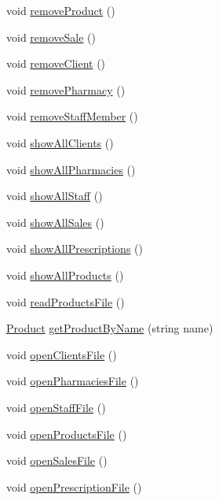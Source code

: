 \begin{DoxyCompactItemize}
void \hyperlink{classDataBase_a6be2328441f5fe20086a4f8b0002adee}{remove\+Product} ()
\item 
void \hyperlink{classDataBase_adba6b4fad6dcb329aae27d8f610edaac}{remove\+Sale} ()
\item 
void \hyperlink{classDataBase_a9fb1b3625b3431d09b4b64a13bbb1e0f}{remove\+Client} ()
\item 
void \hyperlink{classDataBase_af923ee9db26814bf9413afe95262a01d}{remove\+Pharmacy} ()
\item 
void \hyperlink{classDataBase_a26ab8f3d2cb6d78a5105e72c2377c21c}{remove\+Staff\+Member} ()
\item 
void \hyperlink{classDataBase_af4762294e1b25415f7de88f0e8d6d90f}{show\+All\+Clients} ()
\item 
void \hyperlink{classDataBase_ab00290f55389cd62d8ee5594ecf9a6b5}{show\+All\+Pharmacies} ()
\item 
void \hyperlink{classDataBase_aa1d2ae05f581ec45eb8da06e468aec30}{show\+All\+Staff} ()
\item 
void \hyperlink{classDataBase_abf8a64bd81ce3207862b0105d52f646f}{show\+All\+Sales} ()
\item 
void \hyperlink{classDataBase_a40a951f6f2c923ca315655956ab8e196}{show\+All\+Prescriptions} ()
\item 
void \hyperlink{classDataBase_a74dcc435917c328bd89aaf5fd3cb804d}{show\+All\+Products} ()
\item 
void \hyperlink{classDataBase_a32341ca202561239807fb5b3a1f96d13}{read\+Products\+File} ()
\item 
\hyperlink{classProduct}{Product} \hyperlink{classDataBase_ae83d4c612ff8d93b69ab1c05345cd62c}{get\+Product\+By\+Name} (string name)
\item 
void \hyperlink{classDataBase_a514959070d22346ea7ee212e51cab89f}{open\+Clients\+File} ()
\item 
void \hyperlink{classDataBase_a30cd564502803b00dbe575b0bd9376e6}{open\+Pharmacies\+File} ()
\item 
void \hyperlink{classDataBase_a22f0ad79cc0d695ac5c4cfb3c556f920}{open\+Staff\+File} ()
\item 
void \hyperlink{classDataBase_abcf98b385e2a76f71b602e791699dbb3}{open\+Products\+File} ()
\item 
void \hyperlink{classDataBase_a5b7842d4ca431e2edb592fadc16da4c6}{open\+Sales\+File} ()
\item 
void \hyperlink{classDataBase_a10c16844e17eae108e828390a92fb3b8}{open\+Prescription\+File} ()
\item 

\end{DoxyCompactItemize}
